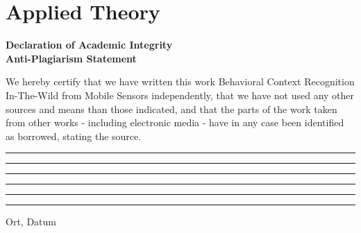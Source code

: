 \documentclass[a4paper,12pt]{scrartcl}
\begin{document}
\newpage
\setcounter{page}{1}









\section{Applied Theory}




























\newpage

\printbibliography




\newpage
{}

\vspace*{1cm}
\begin{center}
	\Large \textbf{Declaration of Academic Integrity}\\
	
	\large \textbf{Anti-Plagiarism Statement}
\end{center}
\normalsize
\vspace{25mm}
We hereby certify that we have written this work \grqq Behavioral Context Recognition In-The-Wild from Mobile Sensors\grqq{} independently, that we have not used any other sources and means than those indicated, and that the parts of the work taken from other works - including electronic media - have in any case been identified as borrowed, stating the source.\\


\begin{center}
	\rule{6cm}{.5pt} \hspace{3cm} \rule{6cm}{.5pt}
\end{center}
\vspace{1cm}
\begin{center}
	\rule{6cm}{.5pt} \hspace{3cm} \rule{6cm}{.5pt}
\end{center}

\vspace{3cm}
	\begin{center}
	\rule{6cm}{.5pt} \hspace{3cm} \rule{6cm}{0pt}
\end{center}	
\vspace{-5mm}
\hspace*{25mm} Ort, Datum	
\end{document}
